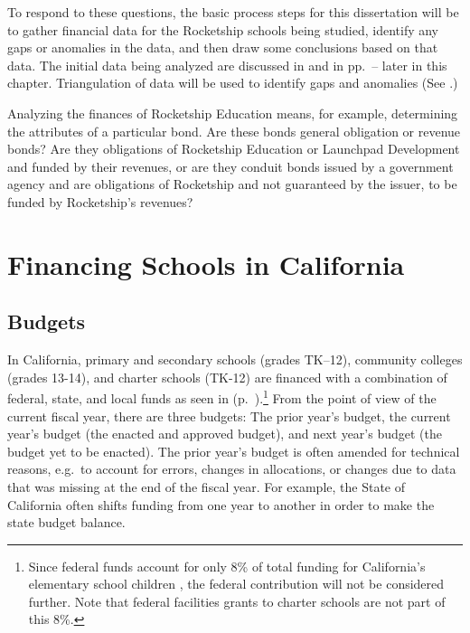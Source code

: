 To respond to these questions, the basic process steps for this dissertation will be to %
%
gather financial data for the Rocketship schools being studied, identify any gaps or anomalies in the data, and then draw some conclusions based on that data.  The initial data being analyzed are discussed in  and  in pp.~\pageref{sec:financing-ca-overview}–\pageref{sec:charter-school-financing} later in this chapter. Triangulation of data will be used to identify gaps and anomalies (See .)

Analyzing the finances of Rocketship Education means, for example, determining the attributes of a particular bond. Are these bonds general obligation or revenue bonds? Are they obligations of Rocketship Education or Launchpad Development and funded by their revenues, or are they conduit bonds issued by a government agency and are obligations of Rocketship and not guaranteed by the issuer, to be funded by Rocketship's revenues?

\section{Financing Schools in California}\label{sec:financing-ca-overview}\indent%

\subsection{Budgets}\indent%

In California, primary and secondary schools (grades TK–12), community colleges (grades 13-14), and charter schools (TK-12) are financed with a combination of federal, state, and local funds as seen in  (p.~\pageref{fig:2019–20_K–12_Funding}).\footnote{Since federal funds account for only 8\% of total funding for California's elementary school children \parencite{LAO2021}, the federal contribution will not be considered further. Note that federal facilities grants to charter schools are not part of this 8\%.} From the point of view of the current fiscal year, there are three budgets: The prior year's budget, the current year's budget (the enacted and approved budget), and next year's budget (the budget yet to be enacted). The prior year's budget is often amended for technical reasons, e.g.~to account for errors, changes in allocations, or changes due to data that was missing at the end of the fiscal year. For example, the State of California often shifts funding from one year to another in order to make the state budget balance.

